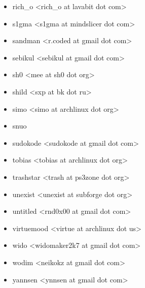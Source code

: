 \begin{itemize}
\item  rich\_o <rich\_o at lavabit dot com>
\item  s1gma <s1gma at mindslicer dot com>
\item  sandman <r.coded at gmail dot com>
\item  sebikul <sebikul at gmail dot com>
\item  sh0 <mee at sh0 dot org>
\item  shild <sxp at bk dot ru>
\item  simo <simo at archlinux dot org>
\item  snuo
\item  sudokode <sudokode at gmail dot com>
\item  tobias <tobias at archlinux dot org>
\item  trashstar <trash at ps3zone dot org>
\item  unexist <unexist at subforge dot org>
\item  untitled <rnd0x00 at gmail dot com>
\item  virtuemood <virtue at archlinux dot us>
\item  wido <widomaker2k7 at gmail dot com>
\item  wodim <neikokz at gmail dot com>
\item  yannsen <ynnsen at gmail dot com>
\end{itemize}
